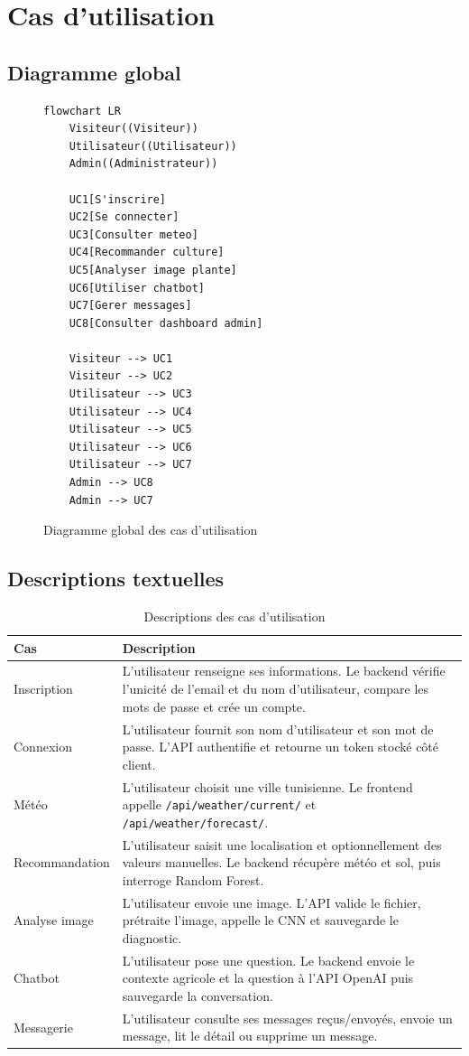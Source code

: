 \section{Cas d'utilisation}
\subsection{Diagramme global}
\begin{figure}[H]
\centering
\caption{Diagramme global des cas d'utilisation}
\begin{lstlisting}[language=mermaid]
flowchart LR
    Visiteur((Visiteur))
    Utilisateur((Utilisateur))
    Admin((Administrateur))

    UC1[S'inscrire]
    UC2[Se connecter]
    UC3[Consulter meteo]
    UC4[Recommander culture]
    UC5[Analyser image plante]
    UC6[Utiliser chatbot]
    UC7[Gerer messages]
    UC8[Consulter dashboard admin]

    Visiteur --> UC1
    Visiteur --> UC2
    Utilisateur --> UC3
    Utilisateur --> UC4
    Utilisateur --> UC5
    Utilisateur --> UC6
    Utilisateur --> UC7
    Admin --> UC8
    Admin --> UC7
\end{lstlisting}
\end{figure}

\subsection{Descriptions textuelles}
\begin{longtable}{p{3cm}p{11cm}}
\caption{Descriptions des cas d'utilisation}\\
\toprule
\textbf{Cas} & \textbf{Description} \\
\midrule
Inscription & L'utilisateur renseigne ses informations. Le backend vérifie l'unicité de l'email et du nom d'utilisateur, compare les mots de passe et crée un compte. \\
Connexion & L'utilisateur fournit son nom d'utilisateur et son mot de passe. L'API authentifie et retourne un token stocké côté client. \\
Météo & L'utilisateur choisit une ville tunisienne. Le frontend appelle \texttt{/api/weather/current/} et \texttt{/api/weather/forecast/}. \\
Recommandation & L'utilisateur saisit une localisation et optionnellement des valeurs manuelles. Le backend récupère météo et sol, puis interroge Random Forest. \\
Analyse image & L'utilisateur envoie une image. L'API valide le fichier, prétraite l'image, appelle le CNN et sauvegarde le diagnostic. \\
Chatbot & L'utilisateur pose une question. Le backend envoie le contexte agricole et la question à l'API OpenAI puis sauvegarde la conversation. \\
Messagerie & L'utilisateur consulte ses messages reçus/envoyés, envoie un message, lit le détail ou supprime un message. \\
\bottomrule
\end{longtable}

